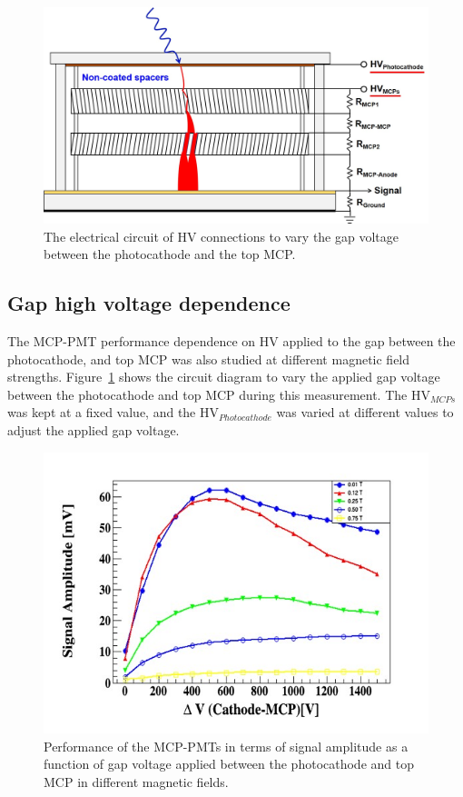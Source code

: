 \documentclass[preprint,5p]{elsarticle}
\begin{document}
\begin{figure}[tbp]
\centering \includegraphics[scale=0.32]{fig/Figure7.jpg}
\caption{The electrical circuit of HV connections to vary the gap voltage 
   between the photocathode and the top MCP.} \label{fig:7}
\end{figure}

\subsection{Gap high voltage dependence} \label{}
The MCP-PMT performance dependence on HV applied to the gap between the 
photocathode, and top MCP was also studied at different magnetic field 
strengths. Figure~\ref{fig:7} shows the circuit diagram to vary the applied gap 
voltage between the photocathode and top MCP during this measurement. The HV$_{MCPs}$ 
was kept at a fixed value, and the HV$_{Photocathode}$ was varied at 
different values to adjust the applied gap voltage. 

\begin{figure}[tbp]
\centering \includegraphics[scale=0.6]{fig/Figure8.jpg}
\caption{Performance of the MCP-PMTs in terms of signal amplitude as a function 
   of gap voltage applied between the photocathode and top MCP in different 
   magnetic fields.} \label{fig:8}
\end{figure} 
\end{document}
